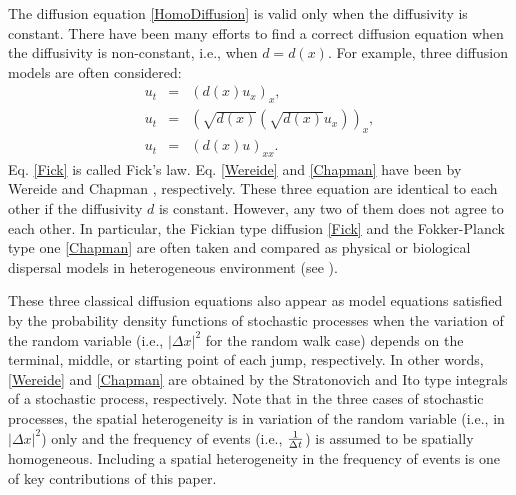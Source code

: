 \documentclass[11pt]{amsart}
\def\x{{x}}
\begin{document}
The diffusion equation \eqref{HomoDiffusion} is valid only when the diffusivity is constant. There have been many efforts to find a correct diffusion equation when the diffusivity is non-constant, i.e., when $d=d(\x)$. For example, three diffusion models are often considered:
\begin{eqnarray}
\label{Fick} u_t &=& (d(\x)u_x)_x, \\
\label{Wereide} u_t &=& ( \sqrt{d(\x)}(\sqrt{d(\x)}u_x))_x, \\
\label{Chapman} u_t &=& (d(\x)u)_{xx}.
\end{eqnarray}
Eq. \eqref{Fick} is called Fick's law. Eq. \eqref{Wereide} and \eqref{Chapman} have been by Wereide \cite{Wereide1914} and Chapman \cite{Chapman1928}, respectively. These three equation are identical to each other if the diffusivity $d$ is constant. However, any two of them does not agree to each other. In particular, the Fickian type diffusion \eqref{Fick} and the Fokker-Planck type one \eqref{Chapman} are often taken and compared as physical or biological dispersal models in heterogeneous environment (see \cite{Bengfort2016,Milligen}).

These three classical diffusion equations also appear as model equations satisfied by the probability density functions of stochastic processes when the variation of the random variable (i.e., $|\Delta x|^2$ for the random walk case) depends on the terminal, middle, or starting point of each jump, respectively. In other words, \eqref{Wereide} and \eqref{Chapman} are obtained by the Stratonovich and Ito type integrals of a stochastic process, respectively. Note that in the three cases of stochastic processes, the spatial heterogeneity is in variation of the random variable (i.e., in $|\Delta x|^2$) only and the frequency of events (i.e., ${1\over\Delta t}$) is assumed to be spatially homogeneous. Including a spatial heterogeneity in the frequency of events is one of key contributions of this paper.
\end{document}

